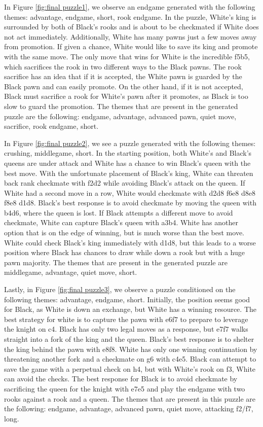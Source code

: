 In Figure \ref{fig:final puzzle1}, we observe an endgame generated with the following themes: advantage, endgame, short, rook endgame. In the puzzle, White's king is surrounded by both of Black's rooks and is about to be checkmated if White does not act immediately. Additionally, White has many pawns just a few moves away from promotion. If given a chance, White would like to save its king and promote with the same move. The only move that wins for White is the incredible f5b5, which sacrifices the rook in two different ways to the Black pawns. The rook sacrifice has an idea that if it is accepted, the White pawn is guarded by the Black pawn and can easily promote. On the other hand, if it is not accepted, Black must sacrifice a rook for White's pawn after it promotes, as Black is too slow to guard the promotion. The themes that are present in the generated puzzle are the following: endgame, advantage, advanced pawn, quiet move, sacrifice, rook endgame, short.

In Figure \ref{fig:final puzzle2}, we see a puzzle generated with the following themes: crushing, middlegame, short. In the starting position, both White's and Black's queens are under attack and White has a chance to win Black's queen with the best move. With the unfortunate placement of Black's king, White can threaten back rank checkmate with f2d2 while avoiding Black's attack on the queen. If White had a second move in a row, White would checkmate with d2d8 f6e8 d8e8 f8e8 d1d8. Black's best response is to avoid checkmate by moving the queen with b4d6, where the queen is lost. If Black attempts a different move to avoid checkmate, White can capture Black's queen with a3b4. White has another option that is on the edge of winning, but is much worse than the best move. White could check Black's king immediately with d1d8, but this leads to a worse position where Black has chances to draw while down a rook but with a huge pawn majority. The themes that are present in the generated puzzle are middlegame, advantage, quiet move, short.

Lastly, in Figure \ref{fig:final puzzle3}, we observe a puzzle conditioned on the following themes: advantage, endgame, short. Initially, the position seems good for Black, as White is down an exchange, but White has a winning resource. The best strategy for white is to capture the pawn with e6f7 to prepare to leverage the knight on c4. Black has only two legal moves as a response, but e7f7 walks straight into a fork of the king and the queen. Black's best response is to shelter the king behind the pawn with e8f8. White has only one winning continuation by threatening another fork and a checkmate on g6 with c4e5. Black can attempt to save the game with a perpetual check on h4, but with White's rook on f3, White can avoid the checks. The best response for Black is to avoid checkmate by sacrificing the queen for the knight with e7e5 and play the endgame with two rooks against a rook and a queen. The themes that are present in this puzzle are the following: endgame, advantage, advanced pawn, quiet move, attacking f2/f7, long.
